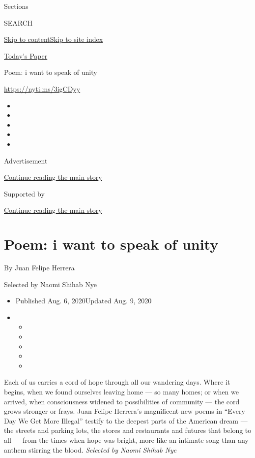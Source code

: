 Sections

SEARCH

\protect\hyperlink{site-content}{Skip to
content}\protect\hyperlink{site-index}{Skip to site index}

\href{https://myaccount.nytimes3xbfgragh.onion/auth/login?response_type=cookie\&client_id=vi}{}

\href{https://www.nytimes3xbfgragh.onion/section/todayspaper}{Today's
Paper}

Poem: i want to speak of unity

\url{https://nyti.ms/3igCDyy}

\begin{itemize}
\item
\item
\item
\item
\item
\end{itemize}

Advertisement

\protect\hyperlink{after-top}{Continue reading the main story}

Supported by

\protect\hyperlink{after-sponsor}{Continue reading the main story}

\hypertarget{poem-i-want-to-speak-of-unity}{%
\section{Poem: i want to speak of
unity}\label{poem-i-want-to-speak-of-unity}}

By Juan Felipe Herrera

Selected by Naomi Shihab Nye

\begin{itemize}
\item
  Published Aug. 6, 2020Updated Aug. 9, 2020
\item
  \begin{itemize}
  \item
  \item
  \item
  \item
  \item
  \end{itemize}
\end{itemize}

Each of us carries a cord of hope through all our wandering days. Where
it begins, when we found ourselves leaving home --- so many homes; or
when we arrived, when consciousness widened to possibilities of
community --- the cord grows stronger or frays. Juan Felipe Herrera's
magnificent new poems in ``Every Day We Get More Illegal'' testify to
the deepest parts of the American dream --- the streets and parking
lots, the stores and restaurants and futures that belong to all --- from
the times when hope was bright, more like an intimate song than any
anthem stirring the blood. \emph{Selected by Naomi Shihab Nye}


